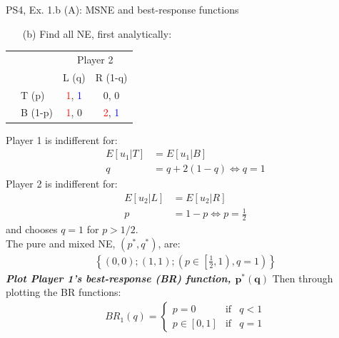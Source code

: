 \begin{frame}{PS4, Ex. 1.b (A): MSNE and best-response functions}
  \begin{multicols}{2}
    \begin{itemize}
      \item[(b)] Find all NE, first analytically:
    \end{itemize}
    \vspace{-8pt}
    \begin{table}
      \begin{tabular}{cl|c|c|}
        & \multicolumn{1}{c}{} & \multicolumn{2}{c}{\color{blue}Player 2}\\
        \parbox[t]{1mm}{}
        &  &  &  \\
        & T (p) & \textcolor{red}{1}, \textcolor{blue}{1} & 0, 0 \\
        & B (1-p) & \textcolor{red}{1}, 0 & \textcolor{red}{2}, \textcolor{blue}{1} \\
      \end{tabular}
    \end{table}
    Player 1 is indifferent for:
    \begin{align*}
      E[u_1|T]&=E[u_1|B]\\
      q &= q + 2(1-q) \Leftrightarrow q = 1
    \end{align*}
    Player 2 is indifferent for:
    \begin{align*}
      E[u_2|L]&=E[u_2|R]\\
      p &= 1-p \Leftrightarrow p = \frac{1}{2}
    \end{align*}
    and chooses $q=1$ for $p>1/2$.\\\medskip
    The pure and mixed NE, $(p^{*},q^{*})$, are:
    \begin{align*}
      \left\{(0,0);(1,1);\left(p\in\left[\frac{1}{2},1\right),q=1\right)\right\}
    \end{align*}
    \textbf{\textit{Plot Player 1's best-response (BR) function, $\bm{p^{*}(q)}$}}
  \vfill\null \columnbreak
    Then through plotting the BR functions:
    \vspace{-8pt}
    \begin{align*}
      BR_1(q)=\left\{ \begin{array}{lcl}
          p=0       & \text{if} & q<1 \\
          p\in[0,1] & \text{if} & q=1

\end{array}
\end{align*}
\end{multicols}
\end{frame}
